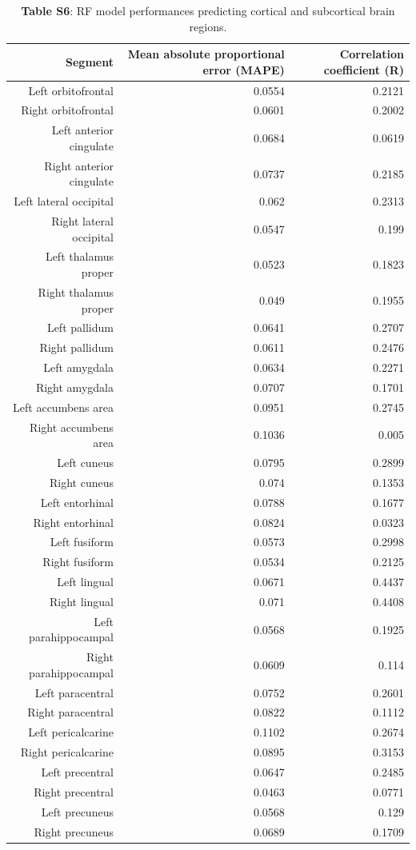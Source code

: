 \documentclass{article}
\begin{document}
\begin{table}[h]

\begin{centering}
  \small
  \begin{tabular}{|r|r|r|}
    \hline\hline
    \textbf{Segment} & \textbf{Mean absolute proportional error (MAPE)} & \textbf{Correlation coefficient (R)} \\\hline
    Left orbitofrontal & 0.0554 & 0.2121 \\
    Right orbitofrontal & 0.0601 & 0.2002 \\
    Left anterior cingulate & 0.0684 & 0.0619 \\
    Right anterior cingulate & 0.0737 & 0.2185 \\
    Left lateral occipital & 0.062 & 0.2313 \\
    Right lateral occipital & 0.0547 & 0.199 \\
    Left thalamus proper & 0.0523 & 0.1823 \\
    Right thalamus proper & 0.049 & 0.1955 \\
    Left pallidum & 0.0641 & 0.2707 \\
    Right pallidum & 0.0611 & 0.2476 \\
    Left amygdala & 0.0634 & 0.2271 \\
    Right amygdala & 0.0707 & 0.1701 \\
    Left accumbens area & 0.0951 & 0.2745 \\
    Right accumbens area & 0.1036 & 0.005 \\
    Left cuneus & 0.0795 & 0.2899 \\
    Right cuneus & 0.074 & 0.1353 \\
    Left entorhinal & 0.0788 & 0.1677 \\
    Right entorhinal & 0.0824 & 0.0323 \\
    Left fusiform & 0.0573 & 0.2998 \\
    Right fusiform & 0.0534 & 0.2125 \\
    Left lingual & 0.0671 & 0.4437 \\
    Right lingual & 0.071 & 0.4408 \\
    Left parahippocampal & 0.0568 & 0.1925 \\
    Right parahippocampal & 0.0609 & 0.114 \\
    Left paracentral & 0.0752 & 0.2601 \\
    Right paracentral & 0.0822 & 0.1112 \\
    Left pericalcarine & 0.1102 & 0.2674 \\
    Right pericalcarine & 0.0895 & 0.3153 \\
    Left precentral & 0.0647 & 0.2485 \\
    Right precentral & 0.0463 & 0.0771 \\
    Left precuneus & 0.0568 & 0.129 \\
    Right precuneus & 0.0689 & 0.1709 \\\hline
  \end{tabular}
  \caption*{
      \textbf{Table S6}: RF model performances predicting cortical and
      subcortical brain regions.
  }
  \end{centering}
\end{table}
\end{document}

